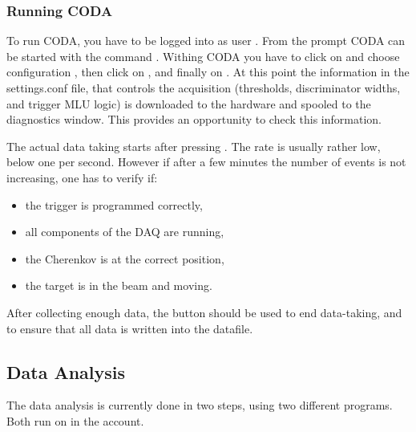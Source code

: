 {{\subsubsection{Running CODA \\ }

To run CODA, you have to be logged into  as user
. From the prompt CODA can be started with the
command . Withing CODA you have to click 
on  and choose configuration ,
then click on , and finally on .
At this point the information in the settings.conf file,
 that controls the acquisition
(thresholds, discriminator widths, and trigger MLU logic) is downloaded to the
hardware and spooled to the diagnostics window. This provides an opportunity
to check this information.

The actual data taking starts after pressing . The rate 
is usually rather low, below one per second. However if after 
a few minutes the number of events is not increasing, one has to 
verify if:
\begin{itemize}
\item the trigger is programmed correctly,
\item all components of the DAQ are running,
\item the Cherenkov is at the correct position,
\item the target is in the beam and moving.
\end{itemize}
After collecting enough data, the  button should be used
to end data-taking, and to ensure that all data is written into the 
datafile.

\subsection{Data Analysis}
\label{sec:ep_analysis}

The data analysis is currently done in two steps, using
two different programs. Both run on  in the
 account.

}}
